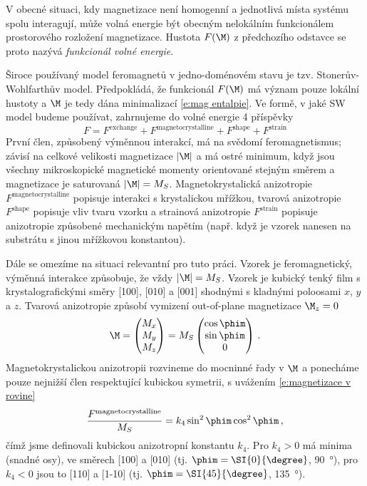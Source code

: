 V obecné situaci, kdy magnetizace není homogenní a jednotlivá místa systému spolu interagují, může volná energie být obecným nelokálním funkcionálem prostorového rozložení magnetizace.
Hustota $F(\M)$ z předchozího odstavce se proto nazývá \emph{funkcionál volné energie}.

Široce používaný model feromagnetů v jedno-doménovém stavu je tzv. Stonerův-Wohlfarthův model\cite{StonerWohlfarth}.
Předpokládá, že funkcionál $F(\M)$ má význam pouze lokální hustoty a $\M$ je tedy dána minimalizací \eqref{e:mag entalpie}. 
Ve formě, v jaké SW model budeme používat, zahrnujeme do volné energie 4 příspěvky\cite{Reichlova}\cite{Janda}\cite{Kucharik}
\begin{equation}
F=F^\textrm{exchange} + F^\textrm{magnetocrystalline} + F^\textrm{shape} + F^\textrm{strain}
\end{equation}
První člen, způsobený výměnnou interakcí, má na svědomí feromagnetismus; závisí na celkové velikosti magnetizace $|\M|$ a má ostré minimum, když jsou všechny mikroskopické magnetické momenty orientované stejným směrem a magnetizace je saturovaná $|\M|=M_S$.
Magnetokrystalická anizotropie $F^\textrm{magnetocrystalline}$ popisuje interakci s krystalickou mřížkou, tvarová anizotropie $F^\textrm{shape}$ popisuje vliv tvaru vzorku a strainová anizotropie $F^\textrm{strain}$ popisuje anizotropie způsobené mechanickým napětím (např. když je vzorek nanesen na substrátu s jinou mřížkovou konstantou).

Dále se omezíme na situaci relevantní pro tuto práci.
Vzorek je feromagnetický, výměnná interakce způsobuje, že vždy $|\M|=M_S$.
Vzorek je kubický tenký film s krystalografickými směry [100], [010] a [001] shodnými s kladnými poloosami $x$, $y$ a $z$.
Tvarová anizotropie způsobí vymizení out-of-plane magnetizace $\M_z=0$
\begin{equation} \label{e:magnetizace v rovine}
\M=\begin{pmatrix}
M_x \\ M_y \\ M_z
\end{pmatrix} = M_S \begin{pmatrix}
\cos \phim \\ \sin \phim \\ 0
\end{pmatrix} \,.
\end{equation}
Magnetokrystalickou anizotropii rozvineme do mocninné řady v $\M$ a ponecháme pouze nejnižší člen respektující kubickou symetrii, s uvážením \eqref{e:magnetizace v rovine}
\begin{equation}
\frac{F^\textrm{magnetocrystalline}}{M_S}=k_4 \sin^2 \phim \cos^2 \phim \,,
\end{equation}
čímž jsme definovali kubickou anizotropní konstantu $k_4$.
Pro $k_4>0$ má minima (snadné osy), ve směrech [100] a [010] (tj. $\phim=\SI{0}{\degree}$, \SI{90}{\degree}), pro $k_4<0$ jsou to [110] a [1-10] (tj. $\phim=\SI{45}{\degree}$, \SI{135}{\degree}).

